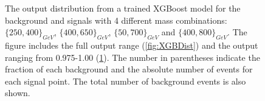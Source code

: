 \begin{figure}
{\begin{subfigure}{.6\textwidth}
        \caption{}
        \label{fig:XGBDist_95}
    \end{subfigure}
    \hfill
    }
    \caption[The output distribution from a trained XGBoost model for the background and signals with 4 different mass combination.]{
    The output distribution from a trained XGBoost model for the background and signals with 4 different mass combinations:
    $\{250,400\}_{GeV}$, $\{400,650\}_{GeV}$, $\{50,700\}_{GeV}$ and $\{400,800\}_{GeV}$. 
    The figure includes the full output range (\ref{fig:XGBDist}) and the output ranging from 0.975-1.00 (\ref{fig:XGBDist_95}).
    The number in parentheses indicate the fraction of each background and the absolute number of events for each signal point. 
    The total number of background events is also shown.}
    \label{fig:XGBDistComp}
\end{figure}
